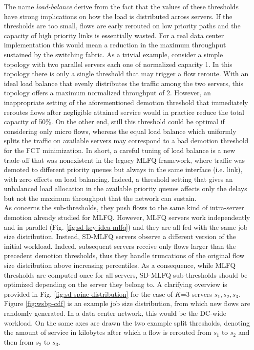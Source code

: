 \smallskip
The name \emph{load-balance} derive from the fact that the values of these thresholds have strong implications on how the load is distributed across servers. If the thresholds are too small, flows are early rerouted on low priority paths and the capacity of high priority links is essentially wasted. For a real data center implementation this would mean a reduction in the maximum throughput sustained by the switching fabric. As a trivial example, consider a simple topology with two parallel servers each one of normalized capacity 1. In this topology there is only a single threshold that may trigger a flow reroute. With an ideal load balance that evenly distributes the traffic among the two servers, this topology offers a maximum normalized throughput of 2. However, an inappropriate setting of the aforementioned demotion threshold that immediately reroutes flows after negligible attained service would in practice reduce the total capacity  of 50\%. On the other end, still this threshold could be optimal if considering only micro flows, whereas the equal load balance which uniformly splits the traffic on available servers may correspond to a bad demotion threshold for the FCT minimization. In short, a careful tuning of load balance is a new trade-off that was nonexistent in the legacy MLFQ framework, where traffic was demoted to different priority queues but always in the same interface (i.e. link), with zero effects on load balancing. Indeed, a threshold setting that gives an unbalanced load allocation in the available priority queues affects only the delays but not the maximum throughput that the network can sustain. \\
As concerns the sub-thresholds, they push flows to the same kind of intra-server demotion already studied for MLFQ. However, MLFQ servers work independently and in parallel (Fig. \ref{fig:sd-key-idea-mlfq}) and they are all fed with the same job size distribution. Instead, SD-MLFQ servers observe a different version of the initial workload. Indeed, subsequent servers receive only flows larger than the precedent demotion thresholds, thus they handle truncations of the original flow size distribution above increasing percentiles. As a consequence, while MLFQ thresholds are computed once for all servers, SD-MLFQ sub-thresholds should be optimized depending on the server they belong to. A clarifying overview is provided in Fig. \ref{fig:sd-spine-distribution} for the case of $K$=3 servers $s_1,s_2,s_3$. Figure \ref{fig:wsbp-cdf} is an example job size distribution, from which new flows are randomly generated. In a data center network, this would be the DC-wide workload. On the same axes are drawn the two example split thresholds, denoting the amount of service in kilobytes after which a flow is rerouted from $s_1$ to $s_2$ and then from $s_2$ to $s_3$. 
